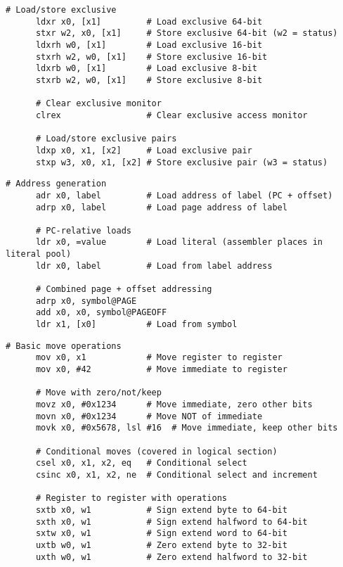   \begin{definition}
    \begin{lstlisting}[language=arm]
      # Load/store exclusive
      ldxr x0, [x1]         # Load exclusive 64-bit
      stxr w2, x0, [x1]     # Store exclusive 64-bit (w2 = status)
      ldxrh w0, [x1]        # Load exclusive 16-bit
      stxrh w2, w0, [x1]    # Store exclusive 16-bit
      ldxrb w0, [x1]        # Load exclusive 8-bit
      stxrb w2, w0, [x1]    # Store exclusive 8-bit
      
      # Clear exclusive monitor
      clrex                 # Clear exclusive access monitor
      
      # Load/store exclusive pairs
      ldxp x0, x1, [x2]     # Load exclusive pair
      stxp w3, x0, x1, [x2] # Store exclusive pair (w3 = status)
    \end{lstlisting}
  \end{definition}

  \begin{definition}
    \begin{lstlisting}[language=arm]
      # Address generation
      adr x0, label         # Load address of label (PC + offset)
      adrp x0, label        # Load page address of label
      
      # PC-relative loads
      ldr x0, =value        # Load literal (assembler places in literal pool)
      ldr x0, label         # Load from label address
      
      # Combined page + offset addressing
      adrp x0, symbol@PAGE
      add x0, x0, symbol@PAGEOFF
      ldr x1, [x0]          # Load from symbol
    \end{lstlisting}
  \end{definition}

  \begin{definition}
    \begin{lstlisting}[language=arm]
      # Basic move operations
      mov x0, x1            # Move register to register
      mov x0, #42           # Move immediate to register
      
      # Move with zero/not/keep
      movz x0, #0x1234      # Move immediate, zero other bits
      movn x0, #0x1234      # Move NOT of immediate
      movk x0, #0x5678, lsl #16  # Move immediate, keep other bits
      
      # Conditional moves (covered in logical section)
      csel x0, x1, x2, eq   # Conditional select
      csinc x0, x1, x2, ne  # Conditional select and increment
      
      # Register to register with operations
      sxtb x0, w1           # Sign extend byte to 64-bit
      sxth x0, w1           # Sign extend halfword to 64-bit
      sxtw x0, w1           # Sign extend word to 64-bit
      uxtb w0, w1           # Zero extend byte to 32-bit
      uxth w0, w1           # Zero extend halfword to 32-bit
    \end{lstlisting}
  \end{definition}

